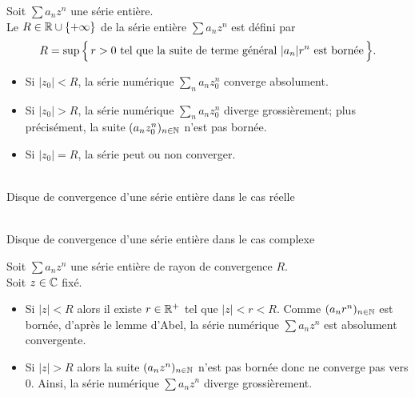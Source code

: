 \documentclass{book}
\begin{document}
\begin{DefinitionProposition}
Soit $\sum a_n z^n$ une série entière.\\
Le  $R\in \mathbb{R} \cup \{+\infty\}$
de la série entière $\sum a_n z^n$ est défini par
$$
  R = \sup \, \Bigl\{ \, r>0 \text{ tel que la suite de terme général } |a_n| r^n \text{ est bornée} \, \Bigr\}.$$
\begin{itemize}
\item Si $|z_0| < R$, la série numérique $\sum _n a_n z_0^n$ converge absolument.
\item Si $|z_0| > R$, la série numérique $\sum _n a_n z_0^n$ diverge grossièrement; plus précisément, la suite $(a_n z_0^n)_{n\in \mathbb{N} }$ n'est pas bornée.
\item Si $|z_0| = R$, la série peut ou non converger.
\end{itemize}
\begin{center}
\\
Disque de convergence d'une série entière dans le cas réelle
\end{center}


\begin{center}
\\
Disque de convergence d'une série entière dans le cas complexe
\end{center}
\end{DefinitionProposition}





\begin{Demonstration}
Soit $\sum a_n z^n$ une série entière de rayon de convergence $R$.\\
Soit $z \in \mathbb{C}$ fixé.
\begin{itemize}
\item Si $|z | < R$ alors il existe $ r\in\mathbb{R}^+$ tel que $|z | < r < R.$
Comme $(a_n r^n)_{n\in \mathbb{N}}$ est bornée, d'après le lemme d'Abel, la série numérique $\sum a_n z^n$ est absolument convergente.
\item Si $|z | > R$ alors la suite $(a_n z^n)_{n\in \mathbb{N}}$ n'est pas bornée donc ne converge pas vers 0.
Ainsi, la série numérique $\sum a_n z^n$ diverge grossièrement.
\end{itemize}

\end{Demonstration}
\end{document}
